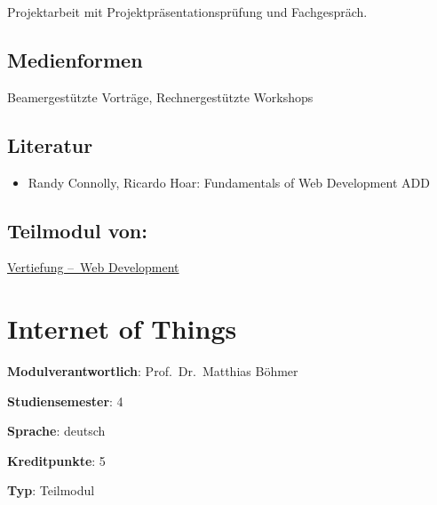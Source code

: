 Projektarbeit mit Projektpräsentationsprüfung und Fachgespräch.

\hypertarget{medienformenpathlabelmi-2017modulbeschreibungen-bachelorba_wd_frontend-development}{%
\section*{Medienformen\label{/mi-2017/modulbeschreibungen-bachelor/BA_WD_Frontend-Development}}\label{medienformenpathlabelmi-2017modulbeschreibungen-bachelorba_wd_frontend-development}}

Beamergestützte Vorträge, Rechnergestützte Workshops

\hypertarget{literaturpathlabelmi-2017modulbeschreibungen-bachelorba_wd_frontend-development}{%
\section*{Literatur\label{/mi-2017/modulbeschreibungen-bachelor/BA_WD_Frontend-Development}}\label{literaturpathlabelmi-2017modulbeschreibungen-bachelorba_wd_frontend-development}}

\begin{itemize}
\tightlist
\item
  Randy Connolly, Ricardo Hoar: Fundamentals of Web Development ADD
\end{itemize}

\hypertarget{teilmodul-vonpathlabelmi-2017modulbeschreibungen-bachelorba_wd_frontend-development}{%
\section*{Teilmodul
von:\label{/mi-2017/modulbeschreibungen-bachelor/BA_WD_Frontend-Development}}\label{teilmodul-vonpathlabelmi-2017modulbeschreibungen-bachelorba_wd_frontend-development}}

\hyperref[/mi-2017/modulbeschreibungen-bachelor/BA_Vertiefung-Web_Development]{Vertiefung – Web Development}

\hypertarget{internet-of-thingspathlabelmi-2017modulbeschreibungen-bachelorba_wd_internet-of-things}{%
\chapter{Internet of
Things\label{/mi-2017/modulbeschreibungen-bachelor/BA_WD_Internet-of-things}}\label{internet-of-thingspathlabelmi-2017modulbeschreibungen-bachelorba_wd_internet-of-things}}

\begin{modulHead}
\textbf{Modulverantwortlich}: Prof.~Dr.~Matthias
Böhmer
\end{modulHead}
\begin{modulHead}
\textbf{Studiensemester}:
4
\end{modulHead}
\begin{modulHead}
\textbf{Sprache}:
deutsch
\end{modulHead}
\begin{modulHead}
\textbf{Kreditpunkte}:
5
\end{modulHead}
\begin{modulHead}
\textbf{Typ}:
Teilmodul
\end{modulHead}


